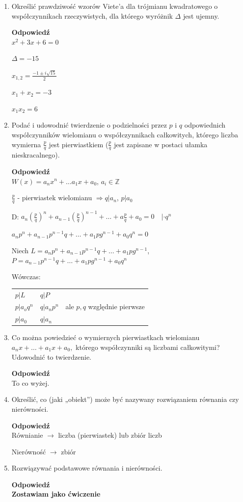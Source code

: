 \documentclass[12pt,a4paper]{article}
\newcounter{twierdzenie}
\theoremstyle{break}
\newcommand{\Odp}[1]{
		\begin{mdframed}[style=zadanie]
			\textbf{Odpowiedź}\\
			#1
		\end{mdframed}
	}
\begin{document}
\begin{enumerate}[1.]
	\item Określić prawdziwość wzorów Viete’a dla trójmianu kwadratowego o współczynnikach rzeczywistych, dla którego wyróżnik $\Delta$ jest ujemny.
	\Odp{
		$x^2+3x+6=0$
		
		$\Delta=-15$
		
		$x_{1,2}=\frac{-1\pm i\sqrt{15}}{2}$
		
		$x_1+x_2 = -3$
		
		$x_1x_2=6$
	}

	\item Podać i udowodnić twierdzenie o podzielności przez $p$ i $q$ odpowiednich współczynników wielomianu o współczynnikach całkowitych, którego liczba wymierna $\frac{p}{q}$ jest pierwiastkiem ($\frac{p}{q}$ jest zapisane w postaci ułamka nieskracalnego).
	\Odp{
		$W(x)=a_nx^n+\dots a_1x+a_0$, $a_i\in\mathbb{Z}$
		
		$\frac{p}{q}$ - pierwiastek wielomianu $\Rightarrow q|a_n$, $p|a_0$
		
		D: $a_n(\frac{p}{q})^n+a_{n-1}(\frac{p}{q})^{n-1}+\dots+a\frac{p}{q}+a_0=0 \quad |\cdot q^n$
		
		$a_np^n+a_{n-1}p^{n-1}q+\dots+a_1pg^{n-1}+a_0q^n=0$
		
		Niech $L=a_np^n+a_{n-1}p^{n-1}q+\dots+a_1pg^{n-1}$, $P=a_{n-1}p^{n-1}q+\dots+a_1pg^{n-1}+a_0q^n$
		
		Wówczas:\\
		
		\begin{tabular}{p{4cm} p{4cm} p{5cm}}
			$p|L$ & $q|P$ &\\
			$p|a_oq^n$ & $q|a_np^n$& ale $p,q$ względnie pierwsze\\
			$p|a_0$&$q|a_n$&\\
		\end{tabular}
		
		
	}
	
	\item Co można powiedzieć o wymiernych pierwiastkach wielomianu $a_nx + \dots + a_1x + a_0,$ którego współczynniki są liczbami całkowitymi? Udowodnić to twierdzenie.
	\Odp{
		To co wyżej.
	}
	
	\item Określić, co (jaki „obiekt”) może być nazywany rozwiązaniem równania czy nierówności.
	\Odp{
		Równianie $\rightarrow$ liczba (pierwiastek) lub zbiór liczb
		
		Nierówność $\rightarrow$ zbiór
	}
	\newpage
	\item Rozwiązywać podstawowe równania i nierówności.
	\Odp{
		\textbf{Zostawiam jako ćwiczenie}
	}
	

\end{enumerate}
\end{document}
